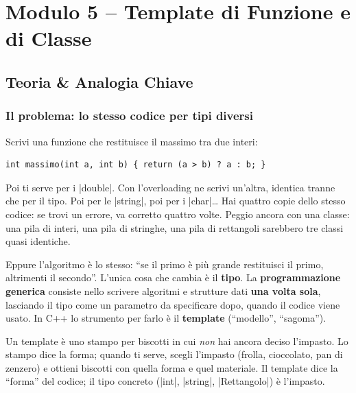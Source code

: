 \chapter{Modulo 5 -- Template di Funzione e di Classe}

\section{Teoria \& Analogia Chiave}

\subsection*{Il problema: lo stesso codice per tipi diversi}

Scrivi una funzione che restituisce il massimo tra due interi:
\begin{lstlisting}
int massimo(int a, int b) { return (a > b) ? a : b; }
\end{lstlisting}
Poi ti serve per i \cc|double|. Con l'overloading ne scrivi un'altra, identica
tranne che per il tipo. Poi per le \cc|string|, poi per i \cc|char|\ldots{} Hai
quattro copie dello stesso codice: se trovi un errore, va corretto quattro volte.
Peggio ancora con una classe: una pila di interi, una pila di stringhe, una pila
di rettangoli sarebbero tre classi quasi identiche.

Eppure l'algoritmo è lo stesso: ``se il primo è più grande restituisci il primo,
altrimenti il secondo''. L'unica cosa che cambia è il \textbf{tipo}. La
\textbf{programmazione generica} consiste nello scrivere algoritmi e strutture
dati \textbf{una volta sola}, lasciando il tipo come un parametro da specificare
dopo, quando il codice viene usato. In C++ lo strumento per farlo è il
\textbf{template} (``modello'', ``sagoma'').

\begin{analogia}
Un template è uno stampo per biscotti in cui \emph{non} hai ancora deciso
l'impasto. Lo stampo dice la forma; quando ti serve, scegli l'impasto (frolla,
cioccolato, pan di zenzero) e ottieni biscotti con quella forma e quel materiale.
Il template dice la ``forma'' del codice; il tipo concreto (\cc|int|,
\cc|string|, \cc|Rettangolo|) è l'impasto.
\end{analogia}

